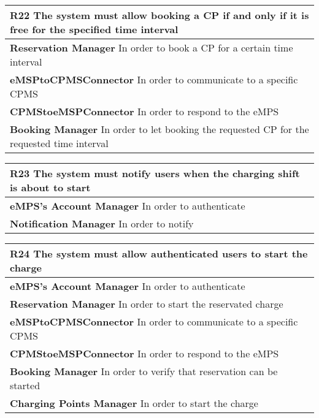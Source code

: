 \begin{table}[H]
    \begin{tabularx}{\textwidth}{X}
        \toprule
        \textbf{R22} The system must allow booking a CP if and only if it is free for the specified time interval                \\ \midrule
        \textbf{Reservation Manager} In order to book a CP for a certain time interval \\ 
        \textbf{eMSPtoCPMSConnector} In order to communicate to a specific CPMS \\ 
        \textbf{CPMStoeMSPConnector} In order to respond to the eMPS \\ 
        \textbf{Booking Manager} In order to let booking the requested CP for the requested time interval \\         
    \end{tabularx}
\end{table}
\begin{table}[H]
    \begin{tabularx}{\textwidth}{X}
        \toprule
        \textbf{R23}  The system must notify users when the charging shift is about to start \\ \midrule
        \textbf{eMPS's Account Manager} In order to authenticate\\                                                                                      
        \textbf{Notification Manager} In order to notify\\
    \end{tabularx}
\end{table}
\begin{table}[H]
    \begin{tabularx}{\textwidth}{X}
        \toprule
        \textbf{R24} The system must allow authenticated users to start the charge \\ \midrule
        \textbf{eMPS's Account Manager} In order to authenticate\\  
        \textbf{Reservation Manager} In order to start the reservated charge  \\ 
        \textbf{eMSPtoCPMSConnector} In order to communicate to a specific CPMS \\ 
        \textbf{CPMStoeMSPConnector} In order to respond to the eMPS \\
        \textbf{Booking Manager} In order to verify that reservation can be started \\               
        \textbf{Charging Points Manager} In order to start the charge \\
    \end{tabularx}
\end{table}
